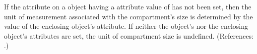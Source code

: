 If the attribute  on a \Compartment object having a
 attribute value of  has not been set, then
the unit of measurement associated with the compartment's size is
determined by the value of the enclosing \Model object's
 attribute.  If neither the \Compartment object's
 nor the enclosing \Model object's 
attributes are set, the unit of compartment size is undefined.
(References: .)

